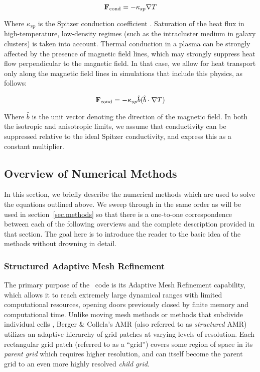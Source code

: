 \begin{equation}
\fcond = -\kappa_{sp} \nabla T
\end{equation}

Where $\kappa_{sp}$ is the Spitzer conduction coefficient
\citep{1962pfig.book.....S}.  Saturation of the heat flux in
high-temperature, low-density regimes (such as the intracluster medium
in galaxy clusters) is taken into account.  Thermal conduction in a
plasma can be strongly affected by the presence of magnetic field
lines, which may strongly suppress heat flow perpendicular to the
magnetic field.  In that case, we allow for heat transport only along
the magnetic field lines in simulations that include this physics, as follows:

\begin{equation}
\fcond= -\kappa_{sp} \hat{b} (\hat{b} \cdot \nabla T)
\end{equation}

Where $\hat{b}$ is the unit vector denoting the direction of the
magnetic field.  In both the isotropic and anisotropic limits, we
assume that conductivity can be suppressed relative to the ideal
Spitzer conductivity, and express this as a constant multiplier.



\subsection{Overview of Numerical Methods}

In this section, we briefly describe the numerical methods which are used to solve the equations outlined above.  We sweep through in the same order as will be used in section~\ref{sec.methods} so that there is a one-to-one correspondence between each of the following overviews and the complete description provided in that section.  The goal here is to introduce the reader to the basic idea of the methods without drowning in detail.

\subsubsection{Structured Adaptive Mesh Refinement}

The primary purpose of the \enzo\ code is its Adaptive Mesh Refinement
capability, which allows it to reach extremely large dynamical ranges
with limited computational resources, opening doors previously closed
by finite memory and computational time. Unlike moving mesh methods
\citep{1995ApJS..100..269P,1995ApJS...97..231G} or  
methods that subdivide 
individual cells \citep{Adjerid}, Berger \& Collela's AMR (also referred 
to as \emph{structured} AMR) utilizes an adaptive hierarchy of grid 
patches at varying levels of resolution.  Each rectangular grid patch 
(referred to as a ``grid'') covers some region of space in its 
\emph{parent grid} which requires higher resolution, and can itself 
become the parent grid to an even more highly resolved \emph{child grid}. 

